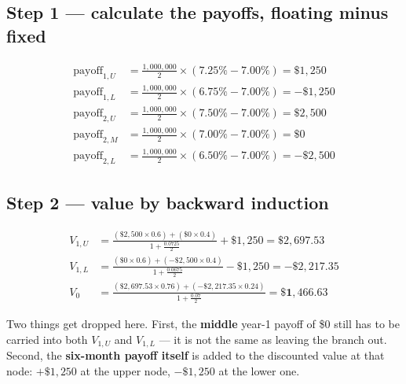 \subsection{Step 1 --- calculate the payoffs, floating minus fixed}
\begin{mrexbox}
\small
\begin{align*}
\text{payoff}_{1,U} &= \tfrac{1{,}000{,}000}{2} \times (7.25\% - 7.00\%) = \$1{,}250\\
\text{payoff}_{1,L} &= \tfrac{1{,}000{,}000}{2} \times (6.75\% - 7.00\%) = -\$1{,}250\\
\text{payoff}_{2,U} &= \tfrac{1{,}000{,}000}{2} \times (7.50\% - 7.00\%) = \$2{,}500\\
\text{payoff}_{2,M} &= \tfrac{1{,}000{,}000}{2} \times (7.00\% - 7.00\%) = \$0\\
\text{payoff}_{2,L} &= \tfrac{1{,}000{,}000}{2} \times (6.50\% - 7.00\%) = -\$2{,}500
\end{align*}
\end{mrexbox}

\subsection{Step 2 --- value by backward induction}
\begin{mrexbox}
\small
\begin{align*}
V_{1,U} &= \frac{(\$2{,}500 \times 0.6) + (\$0 \times 0.4)}{1 + \tfrac{0.0725}{2}} + \$1{,}250
  = \$2{,}697.53\\[4pt]
V_{1,L} &= \frac{(\$0 \times 0.6) + (-\$2{,}500 \times 0.4)}{1 + \tfrac{0.0675}{2}} - \$1{,}250
  = -\$2{,}217.35\\[4pt]
V_{0} &= \frac{(\$2{,}697.53 \times 0.76) + (-\$2{,}217.35 \times 0.24)}{1 + \tfrac{0.07}{2}}
  = \mathbf{\$1{,}466.63}
\end{align*}
\end{mrexbox}

\begin{mrtrapbox}[title={Do not forget the mid values}]
Two things get dropped here. First, the \textbf{middle} year-1 payoff of \$0 still has to be
carried into both $V_{1,U}$ and $V_{1,L}$ --- it is not the same as leaving the branch out.
Second, the \textbf{six-month payoff itself} is added to the discounted value at that node:
$+\$1{,}250$ at the upper node, $-\$1{,}250$ at the lower one.
\end{mrtrapbox}


